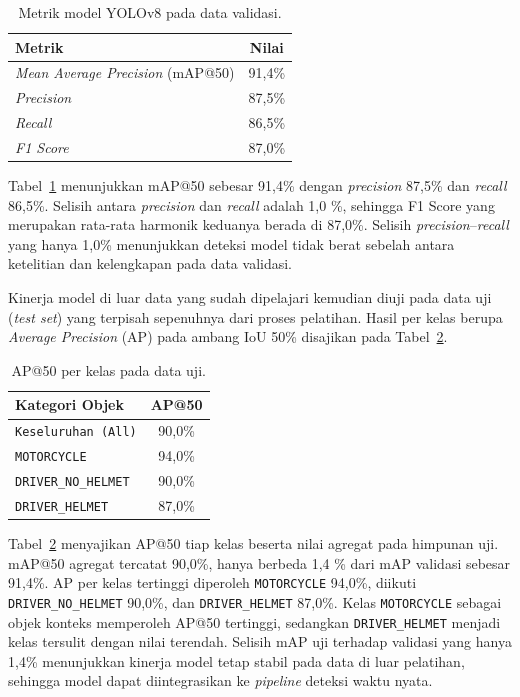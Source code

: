 \begin{table}[htbp]
\centering
\caption{Metrik model YOLOv8 pada data validasi.}
\label{tab:metrik-validasi}
\begin{tabular}{lc}
\toprule
\textbf{Metrik} & \textbf{Nilai} \\
\midrule
\textit{Mean Average Precision} (mAP@50) & 91,4\% \\
\textit{Precision}  & 87,5\% \\
\textit{Recall}     & 86,5\% \\
\textit{F1 Score}     & 87,0\% \\
\bottomrule
\end{tabular}
\end{table}

Tabel~\ref{tab:metrik-validasi} menunjukkan mAP@50 sebesar 91,4\% dengan \textit{precision} 87,5\% dan \textit{recall} 86,5\%. Selisih antara \textit{precision} dan \textit{recall} adalah 1,0 \%, sehingga F1 Score yang merupakan rata-rata harmonik keduanya berada di 87,0\%. Selisih \textit{precision}--\textit{recall} yang hanya 1,0\% menunjukkan deteksi model tidak berat sebelah antara ketelitian dan kelengkapan pada data validasi.

Kinerja model di luar data yang sudah dipelajari kemudian diuji pada data uji (\textit{test set}) yang terpisah sepenuhnya dari proses pelatihan. Hasil per kelas berupa \textit{Average Precision} (AP) pada ambang IoU 50\% disajikan pada Tabel~\ref{tab:metrik-test-objek}.

\begin{table}[htbp]
\centering
\caption{AP@50 per kelas pada data uji.}
\label{tab:metrik-test-objek}
\begin{tabular}{lc}
\toprule
\textbf{Kategori Objek} & \textbf{AP@50} \\
\midrule
\texttt{Keseluruhan (All)}  & 90,0\% \\
\texttt{MOTORCYCLE}         & 94,0\% \\
\texttt{DRIVER\_NO\_HELMET} & 90,0\% \\
\texttt{DRIVER\_HELMET}     & 87,0\% \\
\bottomrule
\end{tabular}
\end{table}

Tabel~\ref{tab:metrik-test-objek} menyajikan AP@50 tiap kelas beserta nilai agregat pada himpunan uji. mAP@50 agregat tercatat 90,0\%, hanya berbeda 1,4 \% dari mAP validasi sebesar 91,4\%. AP per kelas tertinggi diperoleh \texttt{MOTORCYCLE} 94,0\%, diikuti \texttt{DRIVER\_NO\_HELMET} 90,0\%, dan \texttt{DRIVER\_HELMET} 87,0\%. Kelas \texttt{MOTORCYCLE} sebagai objek konteks memperoleh AP@50 tertinggi, sedangkan \texttt{DRIVER\_HELMET} menjadi kelas tersulit dengan nilai terendah. Selisih mAP uji terhadap validasi yang hanya 1,4\% menunjukkan kinerja model tetap stabil pada data di luar pelatihan, sehingga model dapat diintegrasikan ke \textit{pipeline} deteksi waktu nyata.


